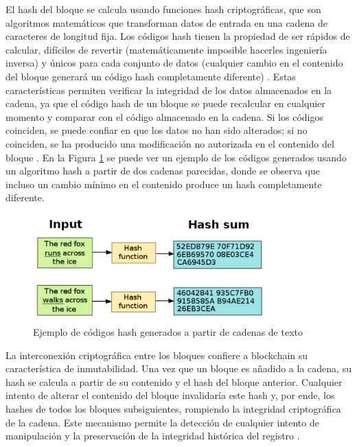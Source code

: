 El hash del bloque se calcula usando funciones hash criptográficas, que son algoritmos matemáticos que transforman datos de entrada en una cadena de caracteres de longitud fija. Los códigos hash tienen la propiedad de ser rápidos de calcular, difíciles de revertir (matemáticamente imposible hacerles ingeniería inversa) y únicos para cada conjunto de datos (cualquier cambio en el contenido del bloque generará un código hash completamente diferente) \cite{pending}. Estas características permiten verificar la integridad de los datos almacenados en la cadena, ya que el código hash de un bloque se puede recalcular en cualquier momento y comparar con el código almacenado en la cadena. Si los códigos coinciden, se puede confiar en que los datos no han sido alterados; si no coinciden, se ha producido una modificación no autorizada en el contenido del bloque \cite{pending}. En la Figura \ref{fig:hash-example} se puede ver un ejemplo de los códigos generados usando un algoritmo hash a partir de dos cadenas parecidas, donde se observa que incluso un cambio mínimo en el contenido produce un hash completamente diferente. 

\begin{figure}[!tb]
    \centering
    \includegraphics[width=0.8\textwidth]{Figures/hash-example.png}
    \caption{Ejemplo de códigos hash generados a partir de cadenas de texto}
    \label{fig:hash-example}
\end{figure}

La interconexión criptográfica entre los bloques confiere a blockchain su característica de inmutabilidad. Una vez que un bloque es añadido a la cadena, su hash se calcula a partir de su contenido y el hash del bloque anterior. Cualquier intento de alterar el contenido del bloque invalidaría este hash y, por ende, los hashes de todos los bloques subsiguientes, rompiendo la integridad criptográfica de la cadena. Este mecanismo permite la detección de cualquier intento de manipulación y la preservación de la integridad histórica del registro \cite{bulkowska2023implementation}. 

